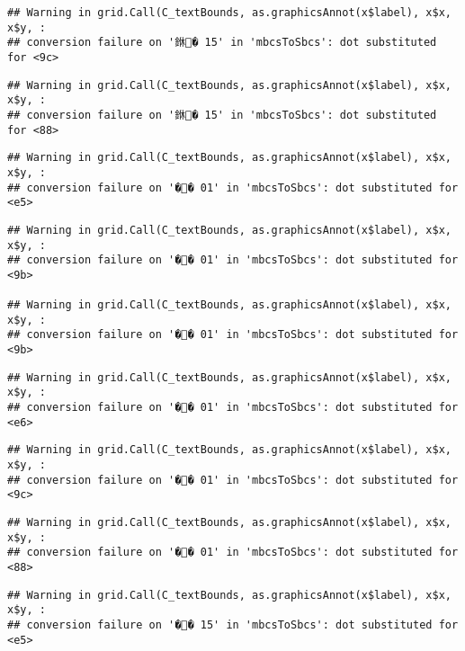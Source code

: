\documentclass[]{article}
\begin{document}
\begin{verbatim}
## Warning in grid.Call(C_textBounds, as.graphicsAnnot(x$label), x$x, x$y, :
## conversion failure on '銝� 15' in 'mbcsToSbcs': dot substituted for <9c>
\end{verbatim}

\begin{verbatim}
## Warning in grid.Call(C_textBounds, as.graphicsAnnot(x$label), x$x, x$y, :
## conversion failure on '銝� 15' in 'mbcsToSbcs': dot substituted for <88>
\end{verbatim}

\begin{verbatim}
## Warning in grid.Call(C_textBounds, as.graphicsAnnot(x$label), x$x, x$y, :
## conversion failure on '�� 01' in 'mbcsToSbcs': dot substituted for <e5>
\end{verbatim}

\begin{verbatim}
## Warning in grid.Call(C_textBounds, as.graphicsAnnot(x$label), x$x, x$y, :
## conversion failure on '�� 01' in 'mbcsToSbcs': dot substituted for <9b>

## Warning in grid.Call(C_textBounds, as.graphicsAnnot(x$label), x$x, x$y, :
## conversion failure on '�� 01' in 'mbcsToSbcs': dot substituted for <9b>
\end{verbatim}

\begin{verbatim}
## Warning in grid.Call(C_textBounds, as.graphicsAnnot(x$label), x$x, x$y, :
## conversion failure on '�� 01' in 'mbcsToSbcs': dot substituted for <e6>
\end{verbatim}

\begin{verbatim}
## Warning in grid.Call(C_textBounds, as.graphicsAnnot(x$label), x$x, x$y, :
## conversion failure on '�� 01' in 'mbcsToSbcs': dot substituted for <9c>
\end{verbatim}

\begin{verbatim}
## Warning in grid.Call(C_textBounds, as.graphicsAnnot(x$label), x$x, x$y, :
## conversion failure on '�� 01' in 'mbcsToSbcs': dot substituted for <88>
\end{verbatim}

\begin{verbatim}
## Warning in grid.Call(C_textBounds, as.graphicsAnnot(x$label), x$x, x$y, :
## conversion failure on '�� 15' in 'mbcsToSbcs': dot substituted for <e5>
\end{verbatim}
\end{document}

